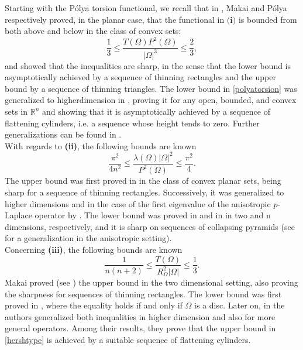 \documentclass[oneside,a4paper,11pt,notitlepage]{article}
\newcommand{\abs}[1]{{\left|#1\right|}}
\theoremstyle{definition}
\theoremstyle{plain}
\theoremstyle{definition}
\begin{document}
Starting with the P\'olya torsion  functional, we recall that in \cite{makai, polya1960}, Makai and P\'olya respectively proved, in the planar case, that the functional in $\textbf{(i)}$ is bounded from both above and below in the class of convex sets:
\begin{equation}
\label{polyatorsion}
\frac{1}{3} \leq  \frac{T(\Omega) P^2(\Omega)}{\abs{\Omega}^3} \leq \frac{2}{3},
\end{equation}
and showed that the inequalities are sharp, in the sense that the lower bound is asymptotically achieved by a sequence of thinning rectangles and the upper bound by a sequence of thinning triangles. The lower bound in \eqref{polyatorsion} was generalized to higherdimension in \cite{gavitone_2014}, proving it for any open, bounded, and convex sets in $\mathbb{R}^n$ and showing that it is asymptotically achieved by a sequence of flattening cylinders, i.e. a sequence whose height tends to zero. 
Further generalizations can be found in \cite{BBP2021,AMPS}.\\
With regards to \textbf{(ii)}, the following bounds are known 
\begin{equation}\label{polyaeigenvalue}
    \frac{\pi^2}{4n^2}\le\frac{\lambda( \Omega) \abs{\Omega}^2}{P^2(\Omega)}\le \frac{\pi^2}{4}.
\end{equation}
The upper bound was first proved in \cite{polya1960} in the class of convex planar sets,
being sharp for a sequence of thinning rectangles. Successively, it was generalized to higher dimensions and in the case of the first eigenvalue of the anisotropic $p$-Laplace operator by \cite{gavitone_2014}. The lower bound was proved in \cite{makai} and in \cite{brasco_inradius} in two and n dimensions, respectively, and it is sharp on sequences of collapsing pyramids (see \cite{DBN} for a generalization in the anisotropic setting).\\
Concerning \textbf{(iii)}, the following bounds are known 
\begin{equation}
\label{hershtype}
\frac{1}{n(n+2)} \le \frac{T(\Omega)}{R_{\Omega}^2\abs{\Omega}} \leq \frac{1}{3}.
\end{equation}
Makai proved (see \cite{makai}) the upper bound in the two dimensional setting, 
also proving the sharpness for sequences of thinning rectangles. The lower bound was first proved in \cite{PS}, where the equality holds if and only if $\Omega$ is a disc.
Later on, in \cite{dellapietra_gavitone2018} the authors generalized both inequalities in higher dimension and also for more general operators. Among their results, they prove that the upper bound in \eqref{hershtype} is achieved by a suitable sequence of flattening cylinders.\\
\end{document}
